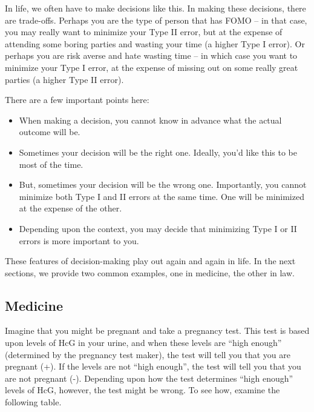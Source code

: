 \documentclass[
  letterpaper,
  DIV=11,
  numbers=noendperiod]{scrreprt}
\providecommand{\tightlist}{%
  \setlength{\itemsep}{0pt}\setlength{\parskip}{0pt}}\usepackage{longtable,booktabs,array}
\theoremstyle{definition}
\theoremstyle{remark}
\begin{document}
In life, we often have to make decisions like this. In making these
decisions, there are trade-offs. Perhaps you are the type of person that
has FOMO -- in that case, you may really want to minimize your Type II
error, but at the expense of attending some boring parties and wasting
your time (a higher Type I error). Or perhaps you are risk averse and
hate wasting time -- in which case you want to minimize your Type I
error, at the expense of missing out on some really great parties (a
higher Type II error).

There are a few important points here:

\begin{itemize}
\tightlist
\item
  When making a decision, you cannot know in advance what the actual
  outcome will be.
\item
  Sometimes your decision will be the right one. Ideally, you'd like
  this to be most of the time.
\item
  But, sometimes your decision will be the wrong one. Importantly, you
  cannot minimize both Type I and II errors at the same time. One will
  be minimized at the expense of the other.
\item
  Depending upon the context, you may decide that minimizing Type I or
  II errors is more important to you.
\end{itemize}

These features of decision-making play out again and again in life. In
the next sections, we provide two common examples, one in medicine, the
other in law.

\hypertarget{sec-medicine}{%
\subsection{Medicine}\label{sec-medicine}}

Imagine that you might be pregnant and take a pregnancy test. This test
is based upon levels of HcG in your urine, and when these levels are
``high enough'' (determined by the pregnancy test maker), the test will
tell you that you are pregnant (+). If the levels are not ``high
enough'', the test will tell you that you are not pregnant (-).
Depending upon how the test determines ``high enough'' levels of HcG,
however, the test might be wrong. To see how, examine the following
table.
\end{document}

